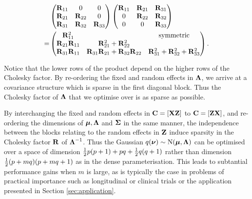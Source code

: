 \documentclass[times, doublespace]{anzsauth}
\begin{document}
  \begin{align*}
  	&\begin{pmatrix}
  	{\bf R}_{11}          & 0                                    & 0                                     \\
  	{\bf R}_{21}          & {\bf R}_{22}                             & 0                                     \\
  	{\bf R}_{31}          & {\bf R}_{32}                             & {\bf R}_{33}                              
  	\end{pmatrix}
  	\begin{pmatrix}
  	{\bf R}_{11}          & {\bf R}_{21}                             & {\bf R}_{31}                              \\
  	0                 & {\bf R}_{22}                             & {\bf R}_{32}                              \\
  	0                 & 0                                    & {\bf R}_{33}                              
  	\end{pmatrix}
  	\\
  	=& \begin{pmatrix}
  	{\bf R}_{11}^2        &                                      & \text{symmetric}                      \\
  	{\bf R}_{21}{\bf R}_{11} & {\bf R}_{21}^2 + {\bf R}_{22}^2 \\
  	{\bf R}_{31} {\bf R}_{11} & {\bf R}_{31}{\bf R}_{21} + {\bf R}_{32} {\bf R}_{22} & {\bf R}_{31}^2 + {\bf R}_{32} ^2 + {\bf R}_{33}^2 
  	\end{pmatrix}.
  \end{align*}

  Notice that the lower rows of the product depend on the higher rows of the Cholesky factor. By re-ordering the fixed and random effects in ${\boldsymbol \Lambda}$, we arrive at a covariance structure which is sparse in the first diagonal block. Thus the Cholesky factor of ${\boldsymbol \Lambda}$ that we optimise over is as sparse as possible. 

	\noindent By interchanging the fixed and random effects in ${\bf C} = [{\bf X} {\bf Z}]$ to ${\bf C} = [{\bf Z} {\bf X}]$, and re-
	ordering the dimensions of ${\boldsymbol \mu}, {\boldsymbol \Lambda}$ and ${\boldsymbol \Sigma}$ in the same manner, the independence between the
	blocks relating to the random effects in ${\bf Z}$ induce sparsity in the Cholesky factor ${\bf R}$ of
	${\boldsymbol \Lambda}^{-1}$. Thus the Gaussian $q({\boldsymbol \nu}) \sim \text{N}({\boldsymbol \mu}, {\boldsymbol \Lambda})$ can be optimised over a space of dimension
	$\tfrac{1}{2} p (p + 1) + pq + \tfrac{1}{2} q (q + 1)$ rather than dimension $\tfrac{1}{2} (p + mq) (p + mq + 1)$ as in the dense
	parameterisation. This leads to subtantial performance gains when $m$ is large, as is typically the case in
	problems of practical importance such as longitudinal or clinical trials or the application presented in
	Section \ref{sec:application}.
	
\end{document}

